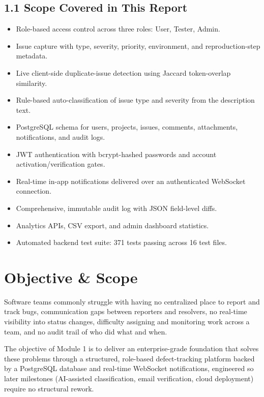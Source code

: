 \documentclass[11pt]{article}
\begin{document}
\subsection{1.1 Scope Covered in This Report}
\begin{itemize}[leftmargin=1.5em,itemsep=2pt]
\item Role-based access control across three roles: User, Tester, Admin.
\item Issue capture with type, severity, priority, environment, and reproduction-step metadata.
\item Live client-side duplicate-issue detection using Jaccard token-overlap similarity.
\item Rule-based auto-classification of issue type and severity from the description text.
\item PostgreSQL schema for users, projects, issues, comments, attachments, notifications, and audit logs.
\item JWT authentication with bcrypt-hashed passwords and account activation/verification gates.
\item Real-time in-app notifications delivered over an authenticated WebSocket connection.
\item Comprehensive, immutable audit log with JSON field-level diffs.
\item Analytics APIs, CSV export, and admin dashboard statistics.
\item Automated backend test suite: 371 tests passing across 16 test files.
\end{itemize}

\section{Objective \& Scope}

Software teams commonly struggle with having no centralized place to report and track bugs, communication gaps between reporters and resolvers, no real-time visibility into status changes, difficulty assigning and monitoring work across a team, and no audit trail of who did what and when.

The objective of Module 1 is to deliver an enterprise-grade foundation that solves these problems through a structured, role-based defect-tracking platform backed by a PostgreSQL database and real-time WebSocket notifications, engineered so later milestones (AI-assisted classification, email verification, cloud deployment) require no structural rework.
\end{document}
